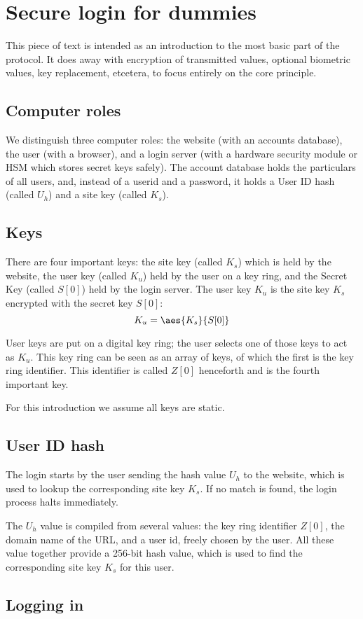 %
\section{Secure login for dummies}
This piece of text is intended as an introduction to the most basic part of the protocol.
It does away with encryption of transmitted values, optional biometric values, key replacement, etcetera, to focus entirely on the core principle.
\subsection{Computer roles}
We distinguish three computer roles:
the website
(with an accounts database),
the user
(with a browser),
and a login server
(with a hardware security module or HSM which stores secret keys safely).
The account database holds the particulars of all users,
and,
instead of a userid and a password,
it holds a User ID hash
(called $U_h$)
and a site key
(called $K_s$).
\subsection{Keys}
There are four important keys:
the site key
(called $K_s$) which is held by the website,
the user key
(called $K_u$) held by the user on a key ring,
and the Secret Key
(called $S[0]$) held by the login server.
The user key $K_u$ is the site key $K_s$ encrypted with the secret key $S[0]$:
\[K_u=\aes{K_s}{S[0]}\]
\par
User keys are put on a digital key ring;
the user selects one of those keys to act as $K_u$.
This key ring can be seen as an array of keys,
of which the first is the key ring identifier.
This identifier is called $Z[0]$ henceforth and is the
fourth important key.
\par
For this introduction we assume all keys are static.
\subsection{User ID hash}
The login starts by the user sending the hash value $U_h$ to the website,
which is used to lookup the corresponding site key $K_s$.
If no match is found,
the login process halts immediately.
\par
The $U_h$ value is compiled from several values:
the key ring identifier $Z[0]$,
the domain name of the URL,
and a user id, freely chosen by the user.
All these value together provide a 256-bit hash value,
which is used to find the corresponding site key $K_s$ for this user.
\subsection{Logging in}
